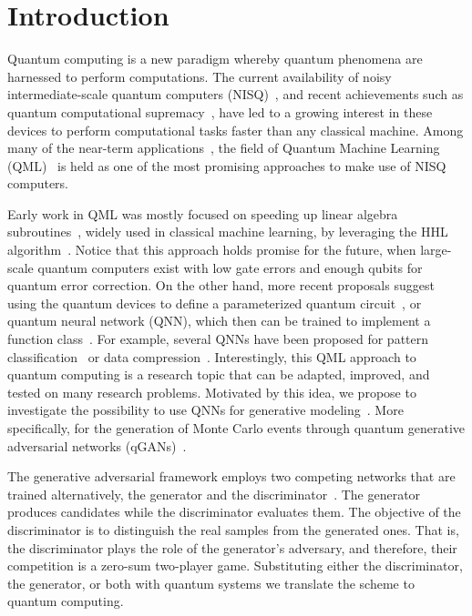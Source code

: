 \documentclass[twocolumn,preprintnumbers,superscriptaddress]{revtex4-2}
\begin{document}
\section{Introduction}

Quantum computing is a new paradigm whereby quantum phenomena are harnessed to
perform computations. The current availability of noisy intermediate-scale
quantum computers (NISQ)~\cite{nisq}, and recent achievements such as quantum
computational supremacy~\cite{supremacy, zhong2020quantum}, have led to a
growing interest in these devices to perform computational tasks faster than any
classical machine. Among many of the near-term
applications~\cite{cerezo2021variational, bharti2021noisy}, the field of Quantum
Machine Learning (QML)~\cite{biamonte2017quantum, schuld2018supervised} is held
as one of the most promising approaches to make use of NISQ computers.

Early work in QML was mostly focused on speeding up linear algebra
subroutines~\cite{wiebe2012quantum, lloyd:2013ml, Rebentrost:2014svm,
  kerenidis2020quantum}, widely used in classical machine learning, by leveraging
the HHL algorithm~\cite{harrow2009quantum}. Notice that this approach holds
promise for the future, when large-scale quantum computers exist with low gate
errors and enough qubits for quantum error correction. On the other hand, more
recent proposals suggest using the quantum devices to define a parameterized
quantum circuit~\cite{benedetti2019parameterized, sim2019expressibility,
  bravo2020scaling}, or quantum neural network (QNN), which then can be trained to
implement a function class~\cite{schuld2021effect, goto2021universal,
  perez2021one}. For example, several QNNs have been proposed for pattern
classification~\cite{havlivcek2019supervised, Schuld:2020circuit,
  perezsalinas:2020reuploading} or data compression~\cite{romero2017quantum,
  bravo2021quantum, cao2021noise}. Interestingly, this QML approach to quantum
computing is a research topic that can be adapted, improved, and tested on many
research problems. Motivated by this idea, we propose to investigate the
possibility to use QNNs for generative modeling~\cite{benedetti2019generative,
  hamilton2019generative, coyle2020born}. More specifically, for the generation of
Monte Carlo events through quantum generative adversarial networks
(qGANs)~\cite{dallaire2018quantum, lloyd2018quantum}.

The generative adversarial framework employs two competing networks that are
trained alternatively, the generator and the
discriminator~\cite{goodfellow2014generative}. The generator produces candidates
while the discriminator evaluates them. The objective of the discriminator is to
distinguish the real samples from the generated ones. That is, the discriminator
plays the role of the generator's adversary, and therefore, their competition is
a zero-sum two-player game. Substituting either the discriminator, the
generator, or both with quantum systems we translate the scheme to quantum
computing.
\end{document}
